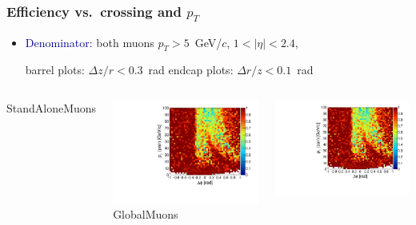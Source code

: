 \documentclass[compress]{beamer}
\begin{document}
\begin{frame}
\frametitle{Efficiency vs.\ crossing and $p_T$}
\begin{itemize}
\item \textcolor{darkblue}{Denominator:} both muons $p_T > 5$~GeV/$c$, $1 < |\eta| < 2.4$,

barrel plots: $\Delta z/r < 0.3$~rad \hfill endcap plots: $\Delta r/z < 0.1$~rad
\end{itemize}

\vfill
\begin{columns}
\centering StandAloneMuons

\includegraphics[width=\linewidth]{barrel_dphipt_dzoverr03cut_StandAloneMuon.pdf}
\centering GlobalMuons

\includegraphics[width=\linewidth]{barrel_dphipt_dzoverr03cut_GlobalMuon.pdf}


\end{columns}
\end{frame}
\end{document}
